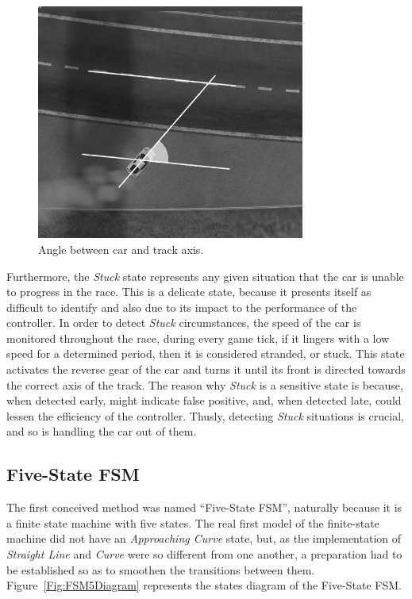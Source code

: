 	\begin{figure}[h]
			
			\centering
			\includegraphics[width=250pt]{ReturnAngle}
			\caption{Angle between car and track axis.}
			\label{Fig:Angle}
			
	\end{figure}
		
	Furthermore, the \emph{Stuck} state represents any given situation that the car is unable to progress in the race. This is a delicate state, because it presents itself as difficult to identify and also due to its impact to the performance of the controller. In order to detect \emph{Stuck} circumstances, the speed of the car is monitored throughout the race, during every game tick, if it lingers with a low speed for a determined period, then it is considered stranded, or stuck. This state activates the reverse gear of the car and turns it until its front is directed towards the correct axis of the track. The reason why \emph{Stuck} is a sensitive state is because, when detected early, might indicate false positive, and, when detected late, could lessen the efficiency of the controller. Thusly, detecting \textit{Stuck} situations is crucial, and so is handling the car out of them.
	
\subsection{Five-State FSM} \label{subsec:FSM5}

	The first conceived method was named ``Five-State FSM'', naturally because it is a finite state machine with five states. The real first model of the finite-state machine did not have an \emph{Approaching Curve} state, but, as the implementation of \emph{Straight Line} and \emph{Curve} were so different from one another, a preparation had to be established so as to smoothen the transitions between them. Figure~\ref{Fig:FSM5Diagram} represents the states diagram of the Five-State FSM.
	
